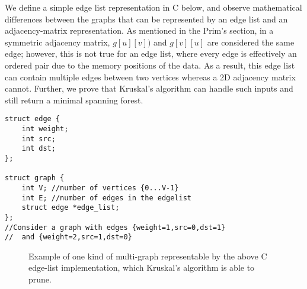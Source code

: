 We define a simple edge list representation in C below, and observe mathematical differences between the graphs that can be represented by an edge list and an adjacency-matrix representation. As mentioned in the Prim's section, in a symmetric adjacency matrix, $g[u][v])$ and $g[v][u]$ are considered the same edge; however, this is not true for an edge list, where every edge is effectively an ordered pair due to the memory positions of the data. As a result, this edge list can contain multiple edges between two vertices whereas a 2D adjacency matrix cannot. Further, we prove that Kruskal's algorithm can handle such inputs and still return a minimal spanning forest.
\newline
\begin{lstlisting}
struct edge {
	int weight;
	int src;
	int dst;
};

struct graph {
	int V; //number of vertices {0...V-1}
	int E; //number of edges in the edgelist
	struct edge *edge_list;
};
//Consider a graph with edges {weight=1,src=0,dst=1}
//	and {weight=2,src=1,dst=0}
\end{lstlisting}
\begin{figure}
\caption{Example of one kind of multi-graph representable by the above C edge-list implementation, which Kruskal's algorithm is able to prune.}
\end{figure}
